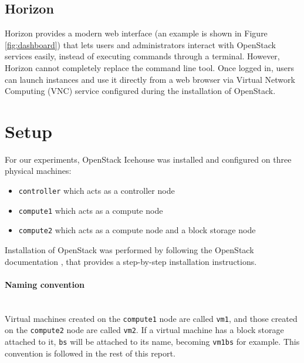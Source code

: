 \subsection{Horizon}
Horizon provides a modern web interface (an example is shown in Figure \ref{fig:dashboard}) that lets users and administrators interact with OpenStack services easily, instead of executing commands through a terminal. 
However, Horizon cannot completely replace the command line tool.
Once logged in, users can launch instances and use it directly from a web browser via Virtual Network Computing (VNC) service configured during the installation of OpenStack.




\section{Setup}
\label{section_setup}
For our experiments, OpenStack Icehouse  was installed and configured on three physical machines:

{
\singlespacing
\begin{itemize}
	\item{\texttt{controller} which acts as a controller node}
	\item{\texttt{compute1} which acts as a compute node}
	\item{\texttt{compute2} which acts as a compute node and a block storage node}
\end{itemize}
}

Installation of OpenStack was performed by following the OpenStack documentation \cite{osinstall}, that provides a step-by-step installation instructions.


\paragraph{Naming convention}\mbox{}\\
Virtual machines created on the \texttt{compute1} node are called \texttt{vm1}, and those created on the \texttt{compute2} node are called \texttt{vm2}. If a virtual machine has a block storage attached to it, \texttt{bs} will be attached to its name, becoming \texttt{vm1bs} for example. This convention is followed in the rest of this report.


